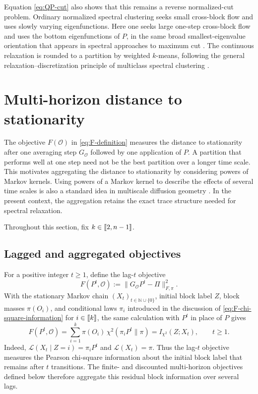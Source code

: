 \documentclass[11pt]{article}
\newcommand{\1}{\mathbf{1}}
\providecommand{\llbracket}{\mathopen{[\mkern-2.7mu[}}
\providecommand{\rrbracket}{\mathclose{]\mkern-2.7mu]}}
\begin{document}
Equation \eqref{eq:QP-cut} also shows that this remains a reverse
normalized-cut problem.  Ordinary normalized spectral clustering
seeks small cross-block flow and uses slowly varying eigenfunctions.
Here one seeks large one-step cross-block flow and uses the bottom
eigenfunctions of $P$, in the same broad smallest-eigenvalue
orientation that appears in spectral approaches to maximum cut
\citep{Trevisan2012}.  The continuous relaxation is rounded to a
partition by weighted $k$-means, following the general
relaxation--discretization principle of multiclass spectral
clustering \citep{YuShi2003}.

\section{Multi-horizon distance to stationarity}
\label{sec:multi-horizon}

The objective $F(\mathcal O)$ in \eqref{eq:F-definition} measures the
distance to stationarity after one averaging step $G_\mathcal{O}$ followed by one
application of $P$.  A partition that performs well at one step need
not be the best partition over a longer time scale.  This motivates
aggregating the distance to stationarity by considering powers of Markov kernels.  Using powers of
a Markov kernel to describe the effects of several time scales is also a
standard idea in multiscale diffusion geometry
\citep{CoifmanLafon2006}.  In the present context, the aggregation
retains the exact trace structure needed for spectral relaxation.

Throughout this section, fix
$k\in\llbracket 2,n-1\rrbracket$.

\subsection{Lagged and aggregated objectives}

For a positive integer $t\geq1$, define the lag-$t$ objective
\begin{equation}
    F(P^t,\mathcal O)
    :=\|G_{\mathcal O}P^t-\Pi\|_{F,\pi}^2.
    \label{eq:F-lag-t}
\end{equation}
With the stationary Markov chain $(X_t)_{t \in \mathbb{N}\cup\{0\}}$, initial block label $Z$,
block masses $\pi(O_i)$, and conditional laws $\pi_i$ introduced in the
discussion of \eqref{eq:F-chi-square-information} for $i \in \llbracket k \rrbracket$, the same
calculation with $P^t$ in place of $P$ gives
\begin{equation*}
    F(P^t,\mathcal O)
    =\sum_{i=1}^k \pi(O_i)\,\chi^2(\pi_iP^t\|\pi)
    =I_{\chi^2}(Z;X_t),
    \qquad t\geq1.
    \label{eq:F-lag-chi-square-information}
\end{equation*}
Indeed, $\mathcal L(X_t\mid Z=i)=\pi_iP^t$ and
$\mathcal L(X_t)=\pi$.  Thus the lag-$t$ objective measures the
Pearson chi-square information about the initial block label that
remains after $t$ transitions.  The finite- and discounted
multi-horizon objectives defined below therefore aggregate this
residual block information over several lags.  
\end{document}
